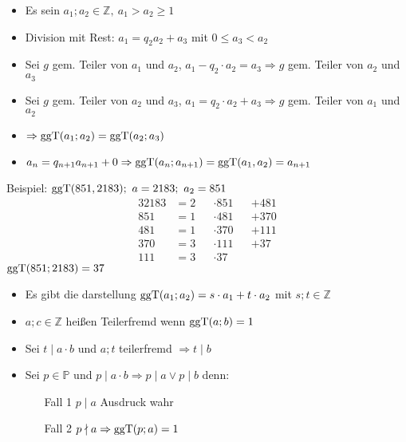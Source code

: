 \begin{itemize}
    \item Es sein $a_1;a_2 \in \mathbb{Z},\ a_1 > a_2 \geq 1$
    \item Division mit Rest: $a_1 = q_2 a_2 + a_3$ mit $0 \leq a_3 < a_2$
    \item Sei $g$ gem. Teiler von $a_1$ und $a_2$, $a_1 - q_2 \cdot a_2 = a_3 \Rightarrow g$ gem. Teiler von $a_2$ und $a_3$
    \item Sei $g$ gem. Teiler von $a_2$ und $a_3$, $a_1 = q_2 \cdot a_2 + a_3 \Rightarrow g$ gem. Teiler von $a_1$ und $a_2$
    \item $\Rightarrow \operatorname{ggT}(a_1;a_2) = \operatorname{ggT}(a_2;a_3)$
    \item $a_{n}=q_{n+1}a_{n+1} + 0 \Rightarrow \operatorname{ggT}(a_n;a_{n+1}) = \operatorname{ggT}(a_1,a_2) = a_{n+1}$
\end{itemize}
Beispiel: $\operatorname{ggT}(851,2183);\ a=2183;\ a_2 = 851$
\begin{alignat*}{3}
    2183 & = 2 &  & \cdot 851 &  & + 481 \\
    851  & = 1 &  & \cdot 481 &  & + 370 \\
    481  & = 1 &  & \cdot 370 &  & + 111 \\
    370  & = 3 &  & \cdot 111 &  & + 37  \\
    111  & = 3 &  & \cdot 37
\end{alignat*}
$\operatorname{ggT}(851;2183) = 37$
\begin{itemize}
    \item Es gibt die darstellung $\operatorname{ggT}(a_1;a_2) = s\cdot a_1 + t \cdot a_2$ mit $s;t \in \mathbb{Z}$
    \item $a;c \in \mathbb{Z}$ heißen Teilerfremd wenn $\operatorname{ggT}(a;b) = 1$
    \item Sei $t \mid a \cdot b$ und $a;t$ teilerfremd $\Rightarrow t \mid b$
    \item Sei $p \in \mathbb{P}$ und $p \mid a \cdot b \Rightarrow p \mid a \vee p \mid b$ denn:
    \begin{itemize}
        \item[Fall 1] $p \mid a$ Ausdruck wahr
        \item[Fall 2] $p \nmid a \Rightarrow \operatorname{ggT}(p;a) = 1$
    \end{itemize}
\end{itemize}